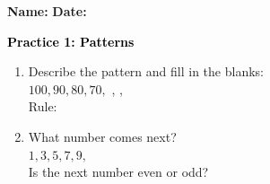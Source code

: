 \documentclass[12pt, letterpaper, fleqn]{article}
\newcommand{\blank}{\underline{\hspace{2.2cm}}}
\newcommand{\blanklong}{\underline{\hspace{6.5cm}}}
\begin{document}
\textbf{Name:} \underline{\hspace{5cm}}
\hfill
\textbf{Date:} \underline{\hspace{3cm}}\\

\begin{tcolorbox}[colback=customteal!20]
    \large\textcolor{black}{\textbf{Practice 1: Patterns}}
\end{tcolorbox}

\vspace{5mm}
\begin{enumerate}[itemsep=2.5cm, leftmargin=0.6cm]
\item Describe the pattern and fill in the blanks:
\\
$100, 90, 80, 70,$ \blank, \blank, \blank \\
Rule: \blanklong

\item What number comes next?
\\
$1, 3, 5, 7, 9,$ \blank \\
Is the next number even or odd? \blank
\end{enumerate}
\end{document}
